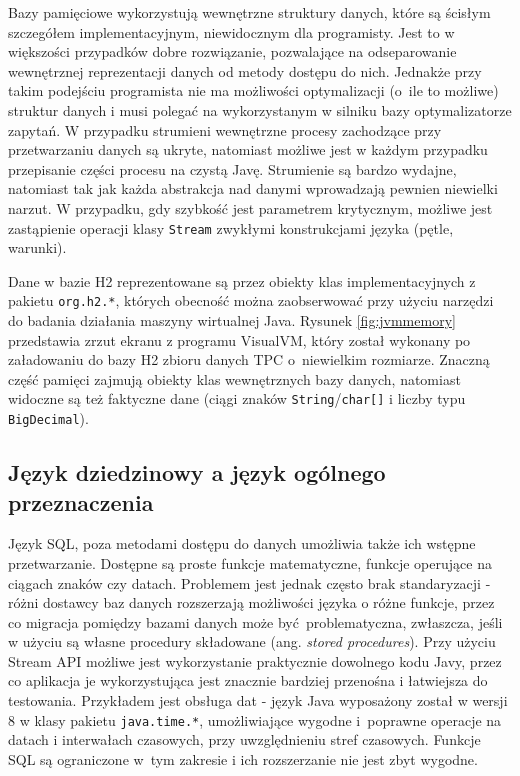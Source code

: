 \documentclass[12pt,twoside,openright]{extarticle}
\begin{document}
    Bazy pamięciowe wykorzystują wewnętrzne struktury danych, które są ścisłym szczegółem implementacyjnym, niewidocznym dla programisty. Jest to w większości przypadków dobre rozwiązanie, pozwalające na odseparowanie wewnętrznej reprezentacji danych od metody dostępu do nich. Jednakże przy takim podejściu programista nie ma możliwości optymalizacji (o~ile to możliwe) struktur danych i musi polegać na wykorzystanym w silniku bazy optymalizatorze zapytań. W przypadku strumieni wewnętrzne procesy zachodzące przy przetwarzaniu danych są ukryte, natomiast możliwe jest w każdym przypadku przepisanie części procesu na czystą Javę. Strumienie są bardzo wydajne, natomiast tak jak każda abstrakcja nad danymi wprowadzają pewnien niewielki narzut. W przypadku, gdy szybkość jest parametrem krytycznym, możliwe jest zastąpienie operacji klasy \texttt{Stream} zwykłymi konstrukcjami języka (pętle, warunki). 

    Dane w bazie H2 reprezentowane są przez obiekty klas implementacyjnych z pakietu \texttt{org.h2.*}, których obecność można zaobserwować przy użyciu narzędzi do badania działania maszyny wirtualnej Java. Rysunek \ref{fig:jvmmemory} przedstawia zrzut ekranu z programu VisualVM, który został wykonany po załadowaniu do bazy H2 zbioru danych TPC o~niewielkim rozmiarze. Znaczną część pamięci zajmują obiekty klas wewnętrznych bazy danych, natomiast widoczne są też faktyczne dane (ciągi znaków \texttt{String}/\texttt{char[]} i liczby typu \texttt{BigDecimal}).

\subsection{Język dziedzinowy a język ogólnego przeznaczenia}

    Język SQL, poza metodami dostępu do danych umożliwia także ich wstępne przetwarzanie. Dostępne są proste funkcje matematyczne, funkcje operujące na ciągach znaków czy datach. Problemem jest jednak często brak standaryzacji - różni dostawcy baz danych rozszerzają możliwości języka o różne funkcje, przez co migracja pomiędzy bazami danych może być problematyczna, zwłaszcza, jeśli w użyciu są własne procedury składowane (ang. \textit{stored procedures}). Przy użyciu Stream API możliwe jest wykorzystanie praktycznie dowolnego kodu Javy, przez co aplikacja je wykorzystująca jest znacznie bardziej przenośna i łatwiejsza do testowania. Przykładem jest obsługa dat - język Java wyposażony został w wersji 8 w klasy pakietu \texttt{java.time.*}, umożliwiające wygodne i~poprawne operacje na datach i interwałach czasowych, przy uwzględnieniu stref czasowych. Funkcje SQL są ograniczone w~tym zakresie i ich rozszerzanie nie jest zbyt wygodne.
\end{document}

